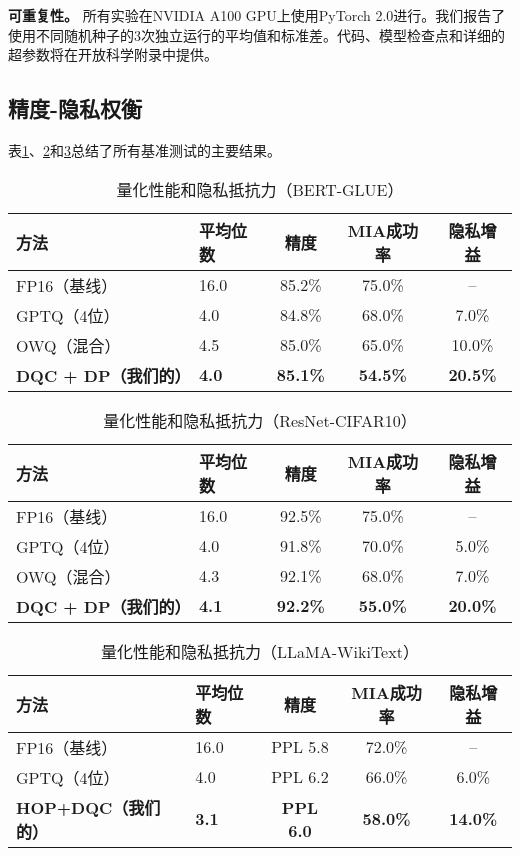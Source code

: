 \documentclass[letterpaper,twocolumn,10pt]{article}
\begin{document}
\textbf{可重复性。} 所有实验在NVIDIA A100 GPU上使用PyTorch 2.0进行。我们报告了使用不同随机种子的3次独立运行的平均值和标准差。代码、模型检查点和详细的超参数将在开放科学附录中提供。

\subsection{精度-隐私权衡}

表\ref{tab:bert_results}、\ref{tab:resnet_results}和\ref{tab:llama_results}总结了所有基准测试的主要结果。

\begin{table}[t]
\centering
\caption{量化性能和隐私抵抗力（BERT-GLUE）}
\label{tab:bert_results}
\tiny
\begin{tabular}{llccc}
\hline
方法 & 平均位数 & 精度 & MIA成功率 & 隐私增益 \\
\hline
FP16（基线） & 16.0 & 85.2\% & 75.0\% & -- \\
GPTQ（4位） & 4.0 & 84.8\% & 68.0\% & 7.0\% \\
OWQ（混合） & 4.5 & 85.0\% & 65.0\% & 10.0\% \\
\textbf{DQC + DP（我们的）} & \textbf{4.0} & \textbf{85.1\%} & \textbf{54.5\%} & \textbf{20.5\%} \\
\hline
\end{tabular}
\end{table}

\begin{table}[t]
\centering
\caption{量化性能和隐私抵抗力（ResNet-CIFAR10）}
\label{tab:resnet_results}
\tiny
\begin{tabular}{llccc}
\hline
方法 & 平均位数 & 精度 & MIA成功率 & 隐私增益 \\
\hline
FP16（基线） & 16.0 & 92.5\% & 75.0\% & -- \\
GPTQ（4位） & 4.0 & 91.8\% & 70.0\% & 5.0\% \\
OWQ（混合） & 4.3 & 92.1\% & 68.0\% & 7.0\% \\
\textbf{DQC + DP（我们的）} & \textbf{4.1} & \textbf{92.2\%} & \textbf{55.0\%} & \textbf{20.0\%} \\
\hline
\end{tabular}
\end{table}

\begin{table}[t]
\centering
\caption{量化性能和隐私抵抗力（LLaMA-WikiText）}
\label{tab:llama_results}
\tiny
\begin{tabular}{llccc}
\hline
方法 & 平均位数 & 精度 & MIA成功率 & 隐私增益 \\
\hline
FP16（基线） & 16.0 & PPL 5.8 & 72.0\% & -- \\
GPTQ（4位） & 4.0 & PPL 6.2 & 66.0\% & 6.0\% \\
\textbf{HOP+DQC（我们的）} & \textbf{3.1} & \textbf{PPL 6.0} & \textbf{58.0\%} & \textbf{14.0\%} \\
\hline
\end{tabular}
\end{table}
\end{document}
